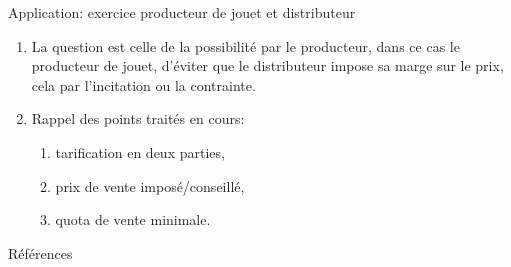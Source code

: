 \begin{frame}[allowframebreaks]{Application: exercice producteur de jouet et distributeur}
\begin{enumerate}
\begin{enumerate}[$\star$]
    \item La question est celle de la possibilité par le producteur, dans ce cas le producteur de jouet, 
    d'éviter que le distributeur impose sa marge sur le prix, 
    cela par l'incitation ou la contrainte.
    \item Rappel des points traités en cours:
    \begin{enumerate}[$\star$]
        \item tarification en deux parties,
        \item prix de vente imposé/conseillé,
        \item quota de vente minimale.
    \end{enumerate}
\end{enumerate}
\end{enumerate}
\end{frame}

\begin{frame}[allowframebreaks]{Références}


\end{frame}

